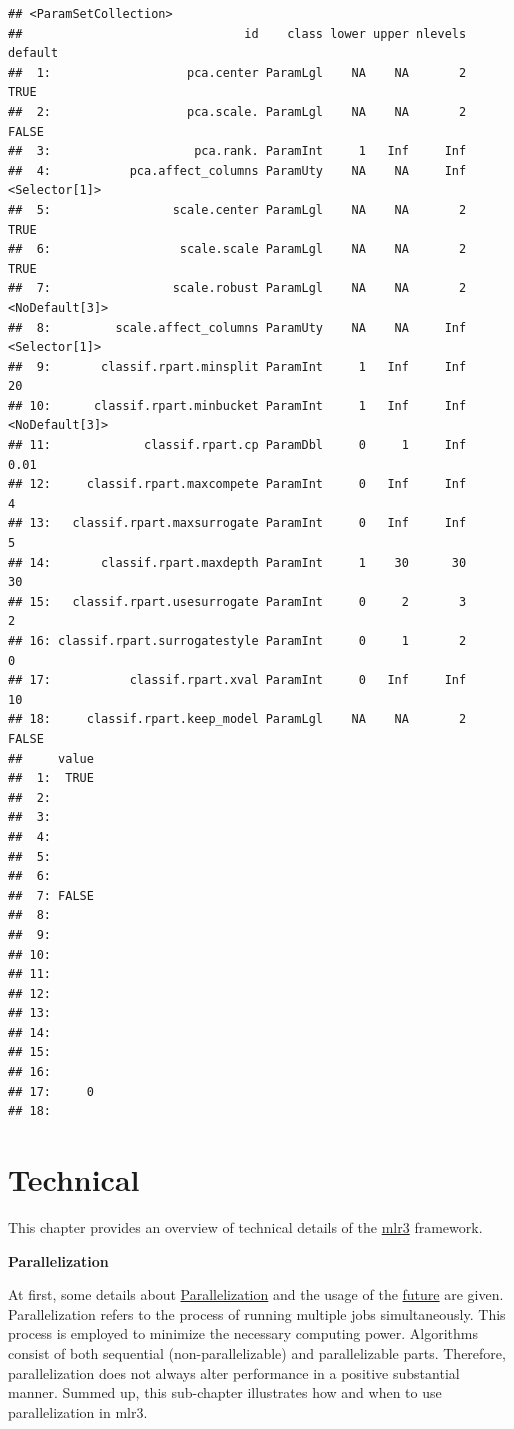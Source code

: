 \documentclass[
]{scrbook}
\begin{document}
\begin{verbatim}
## <ParamSetCollection>
##                               id    class lower upper nlevels        default
##  1:                   pca.center ParamLgl    NA    NA       2           TRUE
##  2:                   pca.scale. ParamLgl    NA    NA       2          FALSE
##  3:                    pca.rank. ParamInt     1   Inf     Inf               
##  4:           pca.affect_columns ParamUty    NA    NA     Inf  <Selector[1]>
##  5:                 scale.center ParamLgl    NA    NA       2           TRUE
##  6:                  scale.scale ParamLgl    NA    NA       2           TRUE
##  7:                 scale.robust ParamLgl    NA    NA       2 <NoDefault[3]>
##  8:         scale.affect_columns ParamUty    NA    NA     Inf  <Selector[1]>
##  9:       classif.rpart.minsplit ParamInt     1   Inf     Inf             20
## 10:      classif.rpart.minbucket ParamInt     1   Inf     Inf <NoDefault[3]>
## 11:             classif.rpart.cp ParamDbl     0     1     Inf           0.01
## 12:     classif.rpart.maxcompete ParamInt     0   Inf     Inf              4
## 13:   classif.rpart.maxsurrogate ParamInt     0   Inf     Inf              5
## 14:       classif.rpart.maxdepth ParamInt     1    30      30             30
## 15:   classif.rpart.usesurrogate ParamInt     0     2       3              2
## 16: classif.rpart.surrogatestyle ParamInt     0     1       2              0
## 17:           classif.rpart.xval ParamInt     0   Inf     Inf             10
## 18:     classif.rpart.keep_model ParamLgl    NA    NA       2          FALSE
##     value
##  1:  TRUE
##  2:      
##  3:      
##  4:      
##  5:      
##  6:      
##  7: FALSE
##  8:      
##  9:      
## 10:      
## 11:      
## 12:      
## 13:      
## 14:      
## 15:      
## 16:      
## 17:     0
## 18:
\end{verbatim}

\hypertarget{technical}{%
\chapter{Technical}\label{technical}}

This chapter provides an overview of technical details of the \href{https://mlr3.mlr-org.com}{mlr3} framework.

\textbf{Parallelization}

At first, some details about \protect\hyperlink{parallelization}{Parallelization} and the usage of the \href{https://cran.r-project.org/package=future}{future} are given.
Parallelization refers to the process of running multiple jobs simultaneously.
This process is employed to minimize the necessary computing power.
Algorithms consist of both sequential (non-parallelizable) and parallelizable parts.
Therefore, parallelization does not always alter performance in a positive substantial manner.
Summed up, this sub-chapter illustrates how and when to use parallelization in mlr3.
\end{document}
